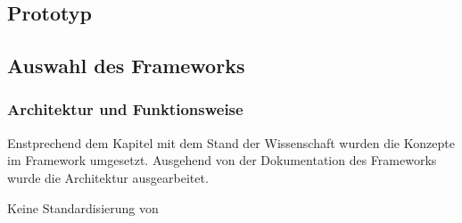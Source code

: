 \subsection{Prototyp}

\subsection{Auswahl des Frameworks}




\subsubsection{Architektur und Funktionsweise}
    Enstprechend dem Kapitel mit dem Stand der Wissenschaft wurden die Konzepte im Framework umgesetzt.
    Ausgehend von der Dokumentation des Frameworks \cite{SoramitsuCo.} wurde die Architektur ausgearbeitet. 
    
    
    Keine Standardisierung von 